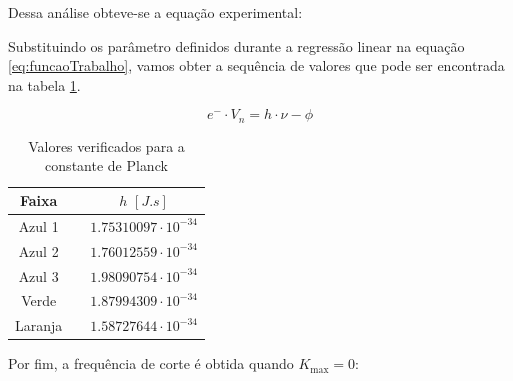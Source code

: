 \documentclass[10pt,twocolumn,letterpaper]{article}
\begin{document}
\noindent Dessa análise obteve-se a equação experimental:




\hspace{1cm} Substituindo os parâmetro definidos durante a regressão linear na equação \ref{eq:funcaoTrabalho}, vamos obter a sequência de valores que pode ser encontrada na tabela \ref{tab:medicoes_Planck}.

\vspace{-.5cm}

\begin{equation}
    \label{eq:funcaoTrabalho}
    e^-\cdot V_n = h \cdot \nu  - \phi
\end{equation}

\vspace{-.75cm}

\begin{table}[htbp]
    \centering
    \caption{Valores verificados para a constante de Planck}
    \label{tab:medicoes_Planck}
    \vspace{0.25cm}
    \begin{tabular}{ccc}
        \hline
        \rule{0pt}{3ex}\textbf{Faixa} & \hspace{0.25cm} & $h\,\,[J.s]$ \\[5pt]
        \hline
        \rule{0pt}{3ex}Azul 1 & \hspace{0.25cm} & $1.75310097\cdot 10^{-34}$ \\
        Azul 2 & \hspace{0.25cm} & $1.76012559\cdot 10^{-34}$ \\
        Azul 3 & \hspace{0.25cm} & $1.98090754\cdot 10^{-34}$ \\
        Verde & \hspace{0.25cm} & $1.87994309\cdot 10^{-34}$ \\
        Laranja & \hspace{0.25cm} & $1.58727644\cdot 10^{-34}$ \\[5pt]
        \hline
    \end{tabular}
\end{table}

Por fim, a frequência de corte é obtida quando $K_{\max} = 0$:

\vspace{-.25cm}
\end{document}
